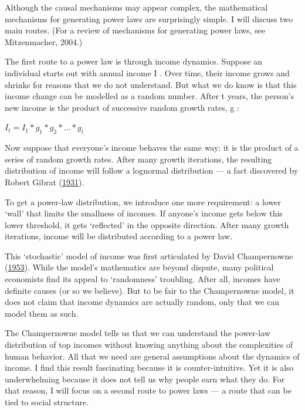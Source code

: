 \documentclass[
]{book}
\begin{document}
Although the causal mechanisms may appear complex, the mathematical mechanisms for generating power laws are surprisingly simple. I will discuss two main routes. (For a review of mechanisms for generating power laws, see Mitzenmacher, 2004.)

The first route to a power law is through income dynamics. Suppose an individual starts out with annual income I . Over time, their income grows and shrinks for reasons that we do not understand. But what we do know is that this income change can be modelled as a random number. After t years, the person's new income is the product of successive random growth rates, g :

\(I_t = I_1 * g_1 * g_2 * ... * g_t\)

Now suppose that everyone's income behaves the same way: it is the product of a series of random growth rates. After many growth iterations, the resulting distribution of income will follow a lognormal distribution --- a fact discovered by Robert Gibrat (\href{https://economicsfromthetopdown.com/2021/10/24/redistributing-income-through-hierarchy/\#ref-gibrat_les_1931}{1931}).

To get a power-law distribution, we introduce one more requirement: a lower `wall' that limits the smallness of incomes. If anyone's income gets below this lower threshold, it gets `reflected' in the opposite direction. After many growth iterations, income will be distributed according to a power law.

This `stochastic' model of income was first articulated by David Champernowne (\href{https://economicsfromthetopdown.com/2021/10/24/redistributing-income-through-hierarchy/\#ref-champernowne_model_1953}{1953}). While the model's mathematics are beyond dispute, many political economists find its appeal to `randomness' troubling. After all, incomes have definite causes (or so we believe). But to be fair to the Champernowne model, it does not claim that income dynamics are actually random, only that we can model them as such.

The Champernowne model tells us that we can understand the power-law distribution of top incomes without knowing anything about the complexities of human behavior. All that we need are general assumptions about the dynamics of income. I find this result fascinating because it is counter-intuitive. Yet it is also underwhelming because it does not tell us why people earn what they do. For that reason, I will focus on a second route to power laws --- a route that can be tied to social structure.
\end{document}
